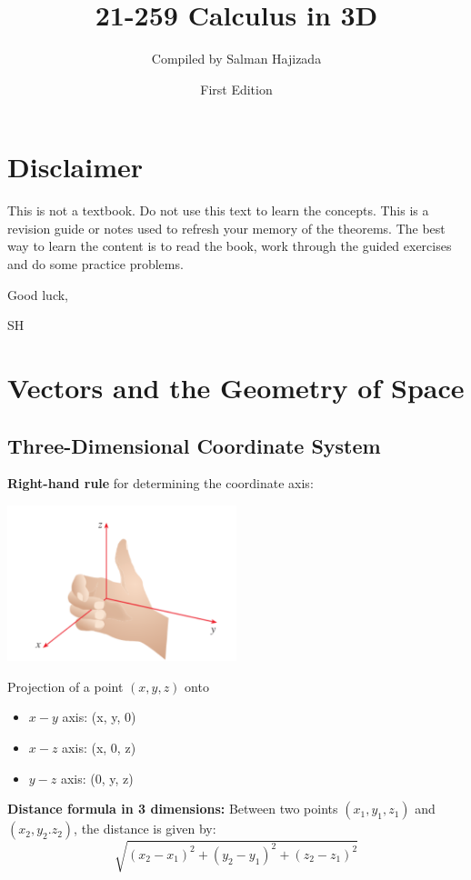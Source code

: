 \documentclass{report}
\title{21-259 Calculus in 3D}
\date{First Edition}
\author{Compiled by Salman Hajizada}
\begin{document}
\maketitle

\setcounter{chapter}{-1}
\chapter{Disclaimer}
This is not a textbook. Do not use this text to learn the concepts.
This is a revision guide or notes used to refresh your memory of the theorems. 
The best way to learn the content is to read the book, work through
the guided exercises and do some practice problems. 

Good luck,

SH
\setcounter{chapter}{11}
\chapter{Vectors and the Geometry of Space}

\section{Three-Dimensional Coordinate System}

\textbf{Right-hand rule} for determining the coordinate axis:

\includegraphics[width=0.5\textwidth]{images/right_hand_rule.png}

Projection of a point $(x, y, z)$ onto
\begin{itemize}
    \item $x-y$ axis: (x, y, 0)
    \item $x-z$ axis: (x, 0, z)
    \item $y-z$ axis: (0, y, z)
\end{itemize} 

\textbf{Distance formula in 3 dimensions:} Between two points $(x_1, y_1, z_1)$ and 
$(x_2, y_2. z_2)$, the distance is given by:
\[\sqrt{(x_2 - x_1)^2 + (y_2 - y_1)^2 +(z_2 - z_1)^2}\]
\end{document}
